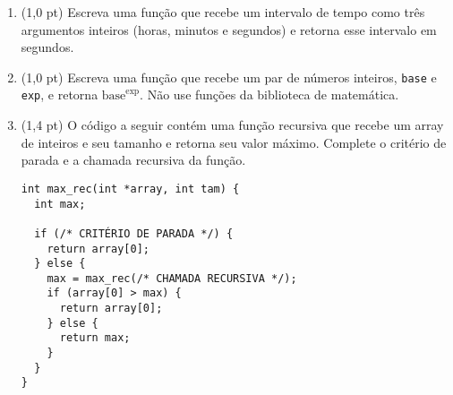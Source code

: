 \documentclass[a4paper,10pt]{article}
\begin{document}
\begin{multicols*}{2}
\begin{enumerate}
  \begin{verbatim}
#include <stdio.h>
int main() {
  int contador = 1;
  char simbolos_a[10] = "****";
  char simbolos_b[10] = "++++++++";

  while (contador <= 6) {
    if (contador % 2 == 1) {
      printf("%s\n", simbolos_a);
    } else {
      printf("%s\n", simbolos_b);
    }
    contador++;
  }

  return 0;
}
  \end{verbatim}

  \vfill\null
  \columnbreak

  \item (1,0 pt) Escreva uma função que recebe um intervalo de tempo como três argumentos inteiros (horas, minutos e segundos) e retorna esse intervalo em segundos.

  \item (1,0 pt) Escreva uma função que recebe um par de números inteiros, \texttt{base} e \texttt{exp}, e retorna $\text{base}^\text{exp}$. Não use funções da biblioteca de matemática.

  \item (1,4 pt) O código a seguir contém uma função recursiva que recebe um array de inteiros e seu tamanho e retorna seu valor máximo. Complete o critério de parada e a chamada recursiva da função.

  \begin{verbatim}
int max_rec(int *array, int tam) {
  int max;

  if (/* CRITÉRIO DE PARADA */) {
    return array[0];
  } else {
    max = max_rec(/* CHAMADA RECURSIVA */);
    if (array[0] > max) {
      return array[0];
    } else {
      return max;
    }
  }
}
  \end{verbatim}
\end{enumerate}
\end{multicols*}

\pagebreak

\maketitle


\end{document}
